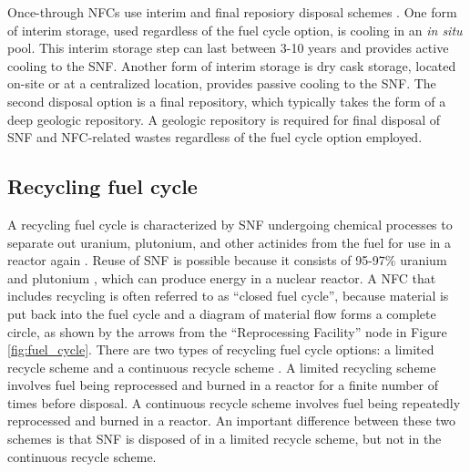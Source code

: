 Once-through \glspl{NFC} use interim and final reposiory disposal schemes
\cite{rodriguez-penalonga_review_2017}. One form of interim 
storage, used regardless of 
the fuel cycle option, is cooling in an \textit{in situ} pool. 
This interim storage step can last between 3-10 years \cite{rodriguez-penalonga_review_2017}
and provides active cooling to the \gls{SNF}.
Another form of interim storage is dry cask storage, located 
on-site or at a centralized location, provides passive 
cooling to the \gls{SNF}. The second disposal 
option is a final repository, which typically takes the form of a 
deep geologic repository. 
A geologic repository is required for final disposal of \gls{SNF} and 
\gls{NFC}-related wastes regardless of the fuel cycle option employed. 

\subsection{Recycling fuel cycle}
A recycling fuel cycle is characterized by \gls{SNF} undergoing chemical 
processes to separate out uranium, plutonium, and other 
actinides from the fuel for use in a reactor again \cite{rodriguez-penalonga_review_2017}. 
Reuse of \gls{SNF} is possible because it consists of 95-97\% uranium and 
plutonium \cite{rodriguez-penalonga_review_2017}, which can  
produce energy in a nuclear reactor. A \gls{NFC} that includes 
recycling is often referred to as ``closed fuel cycle'', because material is 
put back into the fuel cycle and a diagram of material flow forms 
a complete circle, as shown by the arrows from the ``Reprocessing Facility''
node in Figure \ref{fig:fuel_cycle}. 
There are two types of recycling fuel cycle options: a limited 
recycle scheme and a continuous recycle scheme \cite{wigeland_nuclear_2014}. 
A limited recycling scheme involves fuel being reprocessed and burned in 
a reactor for a finite number of times before disposal. A continuous 
recycle scheme involves fuel being repeatedly reprocessed and burned in 
a reactor. An 
important difference between these two schemes is that \gls{SNF} is 
disposed of in a limited recycle scheme, but not in the continuous 
recycle scheme. 

